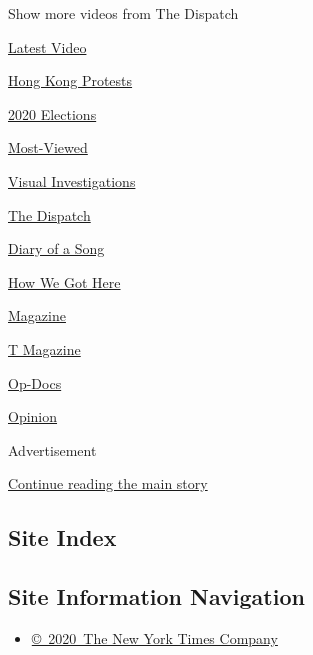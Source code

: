 Show more videos from The Dispatch

\href{/video}{}

\href{/video/latest-video}{Latest Video}

\href{/video/hk-protest}{Hong Kong Protests}

\href{/video/2020-Elections}{2020 Elections}

\href{/video/Most-Viewed}{Most-Viewed}

\href{/video/investigations}{Visual Investigations}

\href{/video/on-the-ground}{The Dispatch}

\href{/video/diaryofasong}{Diary of a Song}

\href{/video/how-we-got-here}{How We Got Here}

\href{/video/magazine}{Magazine}

\href{/video/t-magazine}{T Magazine}

\href{/video/op-docs}{Op-Docs}

\href{/video/opinion}{Opinion}

Advertisement

\protect\hyperlink{after-bottom}{Continue reading the main story}

\hypertarget{site-index}{%
\subsection{Site Index}\label{site-index}}

\hypertarget{site-information-navigation}{%
\subsection{Site Information
Navigation}\label{site-information-navigation}}

\begin{itemize}
\tightlist
\item
  \href{https://help.nytimes3xbfgragh.onion/hc/en-us/articles/115014792127-Copyright-notice}{©~2020~The
  New York Times Company}
\end{itemize}

